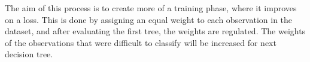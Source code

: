 The aim of this process is to create more of a training phase, where it improves on a loss. This is done by assigning an equal weight to each observation in the dataset, and after evaluating the first tree, the weights are regulated. The weights of the observations that were difficult to classify will be increased for next decision tree.\cite[Chapter~12]{GradientBoosting}














